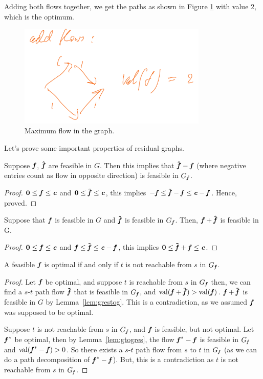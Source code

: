 Adding both flows together, we get the paths as shown in Figure \ref{fig:ex13} with value 2, which is the optimum.
\begin{figure}[H]
 \centering
  \includegraphics[width=90mm,scale=0.5]{fig/fig13_lec10.PNG}
  \caption{Maximum flow in the graph.}\label{fig:ex13}
\end{figure}
Let's prove some important properties of residual graphs.
\begin{lemma}
    \label{lem:gtogres}
Suppose   \(\ff\), \(\ffhat\) are feasible in $G$. Then this implies that \(\ffhat - \ff\)  (where negative entries count as flow in opposite direction) is feasible in \(G_{\ff}\).
\end{lemma}
\begin{proof}
\(\veczero \leq \ff \leq \cc\) and  \(\veczero \leq \fftil \leq \cc\), this implies \(-\ff \leq \fftil - \ff \leq \cc - \ff \). Hence, proved.
\end{proof}
\begin{lemma}
  \label{lem:grestog}
Suppose that \(\ff\) is feasible in \(G\) and \(\ffhat\) is feasible in \(G_{\ff}\). Then, \(\ff + \ffhat\) is feasible in G.
\end{lemma}
\begin{proof}
\(\veczero \leq \ff \leq \cc\) and  \(\ff \leq \fftil \leq \cc - \ff \), this implies \(\veczero \leq \fftil + \ff \leq \cc\).
\end{proof}

\begin{lemma}
A feasible \(\ff\) is optimal if and only if \(t\) is not reachable from \(s\) in \(G_{\ff}\).
\end{lemma}
\begin{proof}
 Let \(\ff\) be optimal, and suppose $t$ is reachable from $s$ in \(G_{\ff}\)
 then, we can find a $s$-$t$ path flow \(\fftil\) that is feasible in \(G_{\ff}\),
 and \(\val(\ff + \fftil) > \val(\ff)\). \(\ff +
 \fftil\) is feasible in $G$ by Lemma~\ref{lem:grestog}. This is a
 contradiction, as we assumed \(\ff\) was supposed to be optimal.

 Suppose $t$ is not reachable from $s$ in \(G_{\ff}\), and \(\ff\) is
 feasible, but not optimal. Let \(\ff^*\) be optimal, then by
 Lemma~\ref{lem:gtogres}, the flow \(\ff^*-\ff\) is feasible in \(G_{\ff}\) and \(\val(\ff^* - \ff) > 0\). So there exists a $s$-$t$ path flow from $s$ to $t$ in \(G_{\ff}\) (as we can do a path decomposition of \(\ff^* - \ff\)). But, this is a contradiction as $t$ is not reachable from $s$ in \(G_{\ff}\).
\end{proof}

